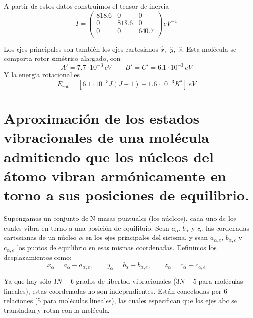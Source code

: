 \documentclass[a4paper]{article}
\begin{document}
 A partir de estos datos construimos el tensor de inercia
 $$ \tilde I =
 \begin{pmatrix}
 818.6 & 0 & 0 \\
 0 & 818.6 & 0 \\
 0 & 0 & 640.7\\
 \end{pmatrix}
 \, eV^{-1}
 $$
 
Los ejes principales son también los ejes cartesianos $ \hat x, \,\ \hat y, \,\ \hat z$. 
Esta molécula se comporta rotor simétrico alargado, con 
 $$A'= 7.7 \cdot 10^{-3}\, eV \qquad B' = C' = 6.1 \cdot 10^{-3}\, eV $$
 Y la energía rotacional es
 $$E_{rot}=[6.1\cdot 10^{-3}J(J+1) -1.6 \cdot 10^{-3}K^2] \, eV$$
\section{Aproximación de los estados vibracionales de una molécula admitiendo que los núcleos del átomo vibran armónicamente en torno a sus posiciones de equilibrio.}
Supongamos un conjunto de N masas puntuales (los núcleos), cada uno de los cuales vibra en torno a una posición de equilibrio. Sean $a_\alpha$, $b_\alpha$ y $c_\alpha$ las cordenadas cartesianas de un núcleo $\alpha$ en los ejes principales del sistema, y sean $a_{\alpha ,e}$, $b_{\alpha ,e}$ y $c_{\alpha ,e}$ los puntos de equilibrio en esas mismas coordenadas. Definimos los desplazamientos como:
\begin{equation}
x_\alpha = a_\alpha - a_{\alpha, e}, \qquad y_\alpha = b_\alpha - b_{\alpha, e}, \qquad z_\alpha = c_\alpha - c_{\alpha, e}
\end{equation}

Ya que hay sólo $3N-6$ grados de libertad vibracionales ($3N-5$ para moléculas lineales), estas coordenadas no son independientes. Están conectadas por 6 relaciones (5 para moléculas lineales), las cuales especifican que los ejes abc se transladan y rotan con la molécula.\\
\end{document}
